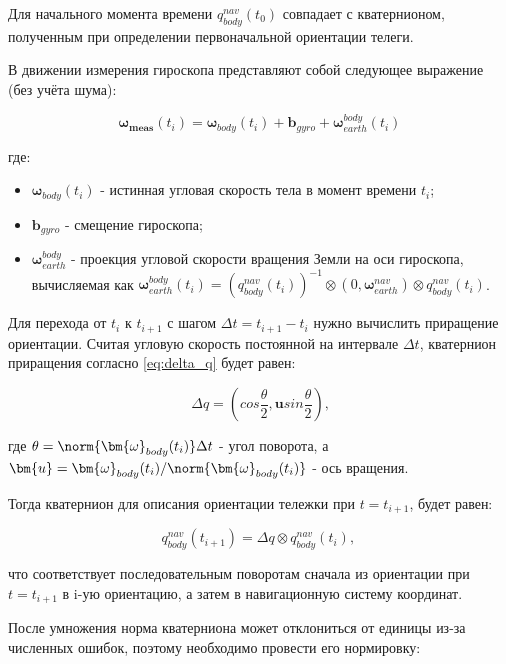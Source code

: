 Для начального момента времени $q_{body}^{nav}(t_0)$ совпадает с кватернионом, полученным при определении первоначальной ориентации телеги.

В движении измерения гироскопа представляют собой следующее выражение (без учёта шума):

\begin{equation*}
	\bm{\omega_{meas}}(t_i) = \bm{\omega}_{body}(t_i) + \bm{b}_{gyro} + \bm{\omega}_{earth}^{body}(t_i)
\end{equation*}

где:
\begin{itemize}
	\item $\bm{\omega}_{body}(t_i)$ - истинная угловая скорость тела в момент времени $t_i$;
	\item $\bm{b}_{gyro}$ - смещение гироскопа;
	\item $\bm{\omega}_{earth}^{body}$ - проекция угловой скорости вращения Земли на оси гироскопа, вычисляемая как $\bm{\omega}_{earth}^{body}(t_i) = \left( q_{body}^{nav}(t_i) \right)^{-1} \otimes \left( 0, \bm{\omega}_{earth}^{nav} \right) \otimes q_{body}^{nav}(t_i)$.
\end{itemize}


Для перехода от $t_i$ к $t_{i+1}$ с шагом $\Delta t = t_{i+1} - t_i$ нужно вычислить приращение ориентации. Считая угловую скорость постоянной на интервале $\Delta t$, кватернион приращения согласно \eqref{eq:delta_q} будет равен:

\begin{equation}
	\Delta q = \left( 
		cos \frac{\theta}{2}, \bm{u} sin \frac{\theta}{2} 
		\right) \text{,}
\end{equation}

где $\theta = \norm{\bm{\omega}_{body}(t_i)} \Delta t$ - угол поворота, а $\bm{u} = \bm{\omega}_{body}(t_i) / \norm{\bm{\omega}_{body}(t_i)}$ - ось вращения.

Тогда кватернион для описания ориентации тележки при $t = t_{i+1}$, будет равен:

\begin{equation}
	q_{body}^{nav}(t_{i+1}) = \Delta q \otimes q_{body}^{nav}(t_i) \text{, }
\end{equation}

что соответствует последовательным поворотам сначала из ориентации при $t = t_{i+1}$ в i-ую ориентацию, а затем в навигационную систему координат.

После умножения норма кватерниона может отклониться от единицы из-за численных ошибок, поэтому необходимо провести его нормировку:

